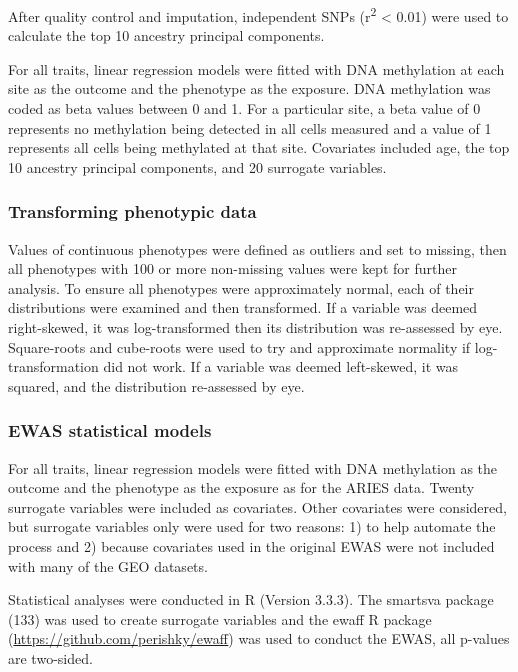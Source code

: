 \documentclass[11pt,oneside]{bristolthesis}
\begin{document}
After quality control and imputation, independent SNPs (r\textsuperscript{2} \textless{} 0.01) were used to calculate the top 10 ancestry principal components.

For all traits, linear regression models were fitted with DNA methylation at each site as the outcome and the phenotype as the exposure. DNA methylation was coded as beta values between 0 and 1. For a particular site, a beta value of 0 represents no methylation being detected in all cells measured and a value of 1 represents all cells being methylated at that site. Covariates included age, the top 10 ancestry principal components, and 20 surrogate variables.

\hypertarget{transforming-phenotypic-data}{%
\subsubsection{Transforming phenotypic data}\label{transforming-phenotypic-data}}

Values of continuous phenotypes were defined as outliers and set to missing, then all phenotypes with 100 or more non-missing values were kept for further analysis. To ensure all phenotypes were approximately normal, each of their distributions were examined and then transformed. If a variable was deemed right-skewed, it was log-transformed then its distribution was re-assessed by eye. Square-roots and cube-roots were used to try and approximate normality if log-transformation did not work. If a variable was deemed left-skewed, it was squared, and the distribution re-assessed by eye.

\hypertarget{ewas-statistical-models}{%
\subsubsection{EWAS statistical models}\label{ewas-statistical-models}}

For all traits, linear regression models were fitted with DNA methylation as the outcome and the phenotype as the exposure as for the ARIES data. Twenty surrogate variables were included as covariates. Other covariates were considered, but surrogate variables only were used for two reasons: 1) to help automate the process and 2) because covariates used in the original EWAS were not included with many of the GEO datasets.

Statistical analyses were conducted in R (Version 3.3.3). The smartsva package (133) was used to create surrogate variables and the ewaff R package (\url{https://github.com/perishky/ewaff}) was used to conduct the EWAS, all p-values are two-sided.
\end{document}
